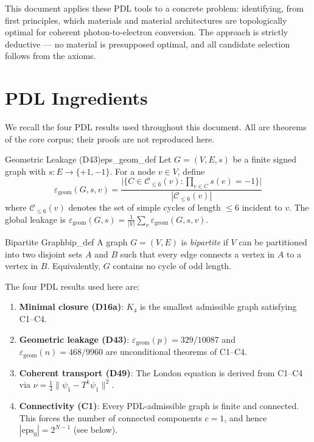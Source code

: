\documentclass[12pt,a4paper]{article}
\newcommand{\epsgeom}{\varepsilon_{\mathrm{geom}}}
\begin{document}
This document applies these PDL tools to a concrete problem: identifying,
from first principles, which materials and material architectures are
topologically optimal for coherent photon-to-electron conversion.
The approach is strictly deductive — no material is presupposed optimal,
and all candidate selection follows from the axioms.

\section{PDL Ingredients}
\label{sec:ingredients}

We recall the four PDL results used throughout this document.
All are theorems of the core corpus; their proofs are not reproduced here.

\begin{definition}{Geometric Leakage (D43)}{eps_geom_def}
Let $G = (V, E, s)$ be a finite signed graph with $s: E \to \{+1,-1\}$.
For a node $v \in V$, define
\[
  \epsgeom(G, s, v)
  = \frac{\bigl|\{C \in \mathcal{C}_{\leq 6}(v) :
    \prod_{e \in C} s(e) = -1\}\bigr|}
         {|\mathcal{C}_{\leq 6}(v)|}
\]
where $\mathcal{C}_{\leq 6}(v)$ denotes the set of simple cycles of
length $\leq 6$ incident to $v$. The global leakage is
$\epsgeom(G,s) = \frac{1}{|V|}\sum_{v} \epsgeom(G,s,v)$.
\end{definition}

\begin{definition}{Bipartite Graph}{bip_def}
A graph $G = (V, E)$ is \emph{bipartite} if $V$ can be partitioned
into two disjoint sets $A$ and $B$ such that every edge connects a vertex
in $A$ to a vertex in $B$. Equivalently, $G$ contains no cycle of odd
length.
\end{definition}

The four PDL results used here are:
\begin{enumerate}[label=\textbf{P\arabic*.}]
  \item \textbf{Minimal closure (D16a)}: $K_4$ is the smallest admissible
    graph satisfying C1--C4.
  \item \textbf{Geometric leakage (D43)}: $\epsgeom(p) = 329/10087$
    and $\epsgeom(n) = 468/9960$ are unconditional theorems of C1--C4.
  \item \textbf{Coherent transport (D49)}: The London equation is derived
    from C1--C4 via $\nu = \tfrac{1}{4}\|\psi_1 - T^k\psi_1\|^2$.
  \item \textbf{Connectivity (C1)}: Every PDL-admissible graph is
    finite and connected. This forces the number of connected components
    $c = 1$, and hence $|\mathrm{eps}_0| = 2^{N-1}$ (see below).
\end{enumerate}
\end{document}
